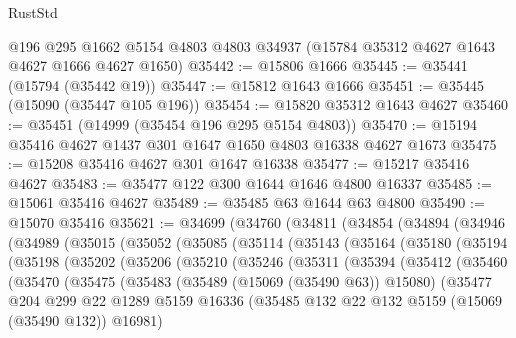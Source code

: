 \begin{lexlean}{RustStd}
\begin{coremodule}
    @196
    @295
    @1662
    @5154
    @4803
    @4803
    @34937
    (@15784 @35312 @4627 @1643 @4627 @1666 @4627 @1650)
@35442 := @15806 @1666
@35445 := @35441 (@15794 (@35442 @19))
@35447 := @15812 @1643 @1666
@35451 := @35445 (@15090 (@35447 @105 @196))
@35454 := @15820 @35312 @1643 @4627
@35460 := @35451 (@14999 (@35454 @196 @295 @5154 @4803))
@35470 := @15194 @35416 @4627 @1437 @301 @1647 @1650 @4803 @16338 @4627 @1673
@35475 := @15208 @35416 @4627 @301 @1647 @16338
@35477 := @15217 @35416 @4627
@35483 := @35477 @122 @300 @1644 @1646 @4800 @16337
@35485 := @15061 @35416 @4627
@35489 := @35485 @63 @1644 @63 @4800
@35490 := @15070 @35416
@35621 := @34699
    (@34760
      (@34811
        (@34854
          (@34894
            (@34946
              (@34989
                (@35015
                  (@35052
                    (@35085
                      (@35114
                        (@35143
                          (@35164
                            (@35180
                              (@35194
                                (@35198
                                  (@35202
                                    (@35206
                                      (@35210
                                        (@35246
                                          (@35311
                                            (@35394
                                              (@35412
                                                (@35460
                                                  (@35470
                                                    (@35475
                                                      (@35483
                                                        (@35489 (@15069 (@35490 @63)) @15080)
                                                        (@35477
                                                          @204
                                                          @299
                                                          @22
                                                          @1289
                                                          @5159
                                                          @16336
                                                          (@35485
                                                            @132
                                                            @22
                                                            @132
                                                            @5159
                                                            (@15069 (@35490 @132))
                                                            @16981)

\end{coremodule}
\end{lexlean}
